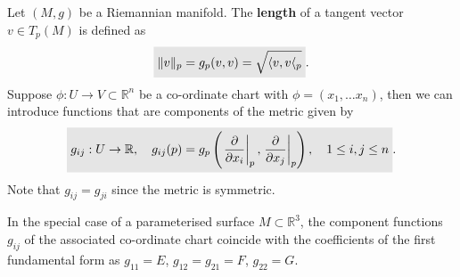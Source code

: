 \documentclass[letter-paper]{tufte-book}
\newenvironment{remark}[1][Remark]{\begin{trivlist}
\item[\hskip \labelsep {\bfseries #1}]}{\end{trivlist}}
\newcommand{\highlight}[1]{\mathchoice%
  {\colorbox{black!10}{$\displaystyle#1$}}%
  {\colorbox{black!10}{$\textstyle#1$}}%
  {\colorbox{black!10}{$\scriptstyle#1$}}%
  {\colorbox{black!10}{$\scriptscriptstyle#1$}}}%
\begin{document}
Let $(M, g)$ be a Riemannian manifold. The \textbf{length} of a tangent vector $v \in T_p(M)$ is defined as
\begin{equation}
  \highlight{\|v\|_p = g_p(v, v) = \sqrt{\langle v, v \langle_p}}.
\end{equation}
Suppose $\phi: U\to V\subset \mathbb{R}^n$ be a co-ordinate chart with $\phi= (x_1, \ldots x_n)$, then we can introduce functions that are components of the metric given by
\begin{equation}
  \highlight{g_{ij} : U \to \mathbb{R}, \quad g_{ij}(p) = g_p \left(\left.\frac{\partial}{\partial x_i}\right|_p, \left.\frac{\partial}{\partial x_j}\right|_p\right), \quad 1\leq i,j \leq n}.
\end{equation}
Note that $g_{ij} = g_{ji}$ since the metric is symmetric.

\begin{remark}
  In the special case of a parameterised surface $M \subset \mathbb{R}^3$, the component functions $g_{ij}$ of the associated co-ordinate chart coincide with the coefficients of the first fundamental form as $g_{11} = E$, $g_{12} = g_{21} = F$, $g_{22} = G$.
\end{remark}
\end{document}
